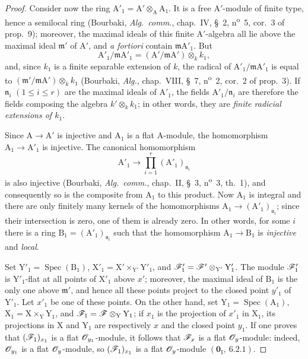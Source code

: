 \begin{proof}
Consider now the ring $\mathrm{A}'_1=\mathrm{A}'\otimes_\mathrm{A}\mathrm{A}_1$.
It is a free $\mathrm{A}'$-module of finite type, hence a semilocal ring (Bourbaki, \emph{Alg.\ comm.}, chap.~IV, \S~2, n\textsuperscript{o}~5, cor.~3 of prop.~9); moreover, the maximal ideals of this finite $\mathrm{A}'$-algebra all lie above the maximal ideal $\mathfrak{m}'$ of $\mathrm{A}'$, and \emph{a fortiori} contain $\mathfrak{m}\mathrm{A}'_1$.
But
\[
\mathrm{A}'_1/\mathfrak{m}\mathrm{A}'_1=(\mathrm{A}'/\mathfrak{m}\mathrm{A}')\otimes_k k_1,
\]
and, since $k_1$ is a finite separable extension of $k$, the radical of $\mathrm{A}'_1/\mathfrak{m}\mathrm{A}'_1$ is equal to $(\mathfrak{m}'/\mathfrak{m}\mathrm{A}')\otimes_k k_1$ (Bourbaki, \emph{Alg.}, chap.~VIII, \S~7, n\textsuperscript{o}~2, cor.~2 of prop.~3).
If $\mathfrak{n}_i$ $(1\leq i\leq r)$ are the maximal ideals of $\mathrm{A}'_1$, the fields $\mathrm{A}'_1/\mathfrak{n}_i$ are therefore the fields composing the algebra $k'\otimes_k k_1$; in other words, they are \emph{finite radicial extensions of $k_1$}.

Since $\mathrm{A}\to\mathrm{A}'$ is injective and $\mathrm{A}_1$ is a flat $\mathrm{A}$-module, the homomorphism $\mathrm{A}_1\to\mathrm{A}'_1$ is injective.
The canonical homomorphism
\[
\mathrm{A}'_1\longrightarrow\prod_{i=1}^{r}(\mathrm{A}'_1)_{\mathfrak{n}_i}
\]
is also injective (Bourbaki, \emph{Alg.\ comm.}, chap.~II, \S~3, n\textsuperscript{o}~3, th.~1), and consequently so is the composite from $\mathrm{A}_1$ to this product.
Now $\mathrm{A}_1$ is integral and there are only finitely many kernels of the homomorphisms $\mathrm{A}_1\to(\mathrm{A}'_1)_{\mathfrak{n}_i}$; since their intersection is zero, one of them is already zero.
In other words, for some $i$ there is a ring $\mathrm{B}_1=(\mathrm{A}'_1)_{\mathfrak{n}_i}$ such that the homomorphism $\mathrm{A}_1\to\mathrm{B}_1$ is \emph{injective} and \emph{local}.

Set $\mathrm{Y}'_1=\operatorname{Spec}(\mathrm{B}_1)$, $\mathrm{X}'_1=\mathrm{X}'\times_{\mathrm{Y}'}\mathrm{Y}'_1$, and $\mathscr{F}'_1=\mathscr{F}'\otimes_{\mathrm{Y}'}\mathrm{Y}'_1$.
The module $\mathscr{F}'_1$ is $\mathrm{Y}'_1$-flat at all points of $\mathrm{X}'_1$ above $x'$; moreover, the maximal ideal of $\mathrm{B}_1$ is the only one above $\mathfrak{m}'$, and hence all these points project to the closed point $y'_1$ of $\mathrm{Y}'_1$.
Let $x'_1$ be one of these points.
On the other hand, set $\mathrm{Y}_1=\operatorname{Spec}(\mathrm{A}_1)$, $\mathrm{X}_1=\mathrm{X}\times_\mathrm{Y}\mathrm{Y}_1$, and $\mathscr{F}_1=\mathscr{F}\otimes_\mathrm{Y}\mathrm{Y}_1$; if $x_1$ is the projection of $x'_1$ in $\mathrm{X}_1$, its projections in $\mathrm{X}$ and $\mathrm{Y}_1$ are respectively $x$ and the closed point $y_1$.
If one proves that $(\mathscr{F}_1)_{x_1}$ is a flat $\mathscr{O}_{y_1}$-module, it follows that $\mathscr{F}_x$ is a flat $\mathscr{O}_y$-module: indeed, $\mathscr{O}_{y_1}$ is a flat $\mathscr{O}_y$-module, so $(\mathscr{F}_1)_{x_1}$ is a flat $\mathscr{O}_y$-module $(\mathbf{0}_\mathrm{I},~6.2.1)$.


\end{proof}

